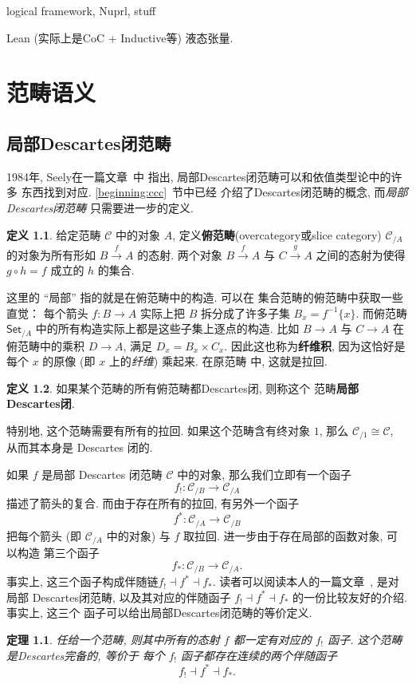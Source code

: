 \documentclass[UTF8]{ctexbook}
\theoremstyle{plain}
\newtheorem{theorem}{定理}[chapter]
\theoremstyle{definition}
\newtheorem{definition}{定义}[chapter]
\theoremstyle{remark}
\begin{document}
logical framework, Nuprl, stuff

Lean (实际上是CoC + Inductive等)
液态张量.\cite{scholze:2020:liquid}

\chapter{范畴语义}

\section{局部Descartes闭范畴}

1984年, Seely在一篇文章~\cite{seely:1984:lccc}中
指出, 局部Descartes闭范畴可以和依值类型论中的许多
东西找到对应. \ref{beginning:ccc}~节中已经
介绍了Descartes闭范畴的概念, 而\emph{局部Descartes闭范畴}
只需要进一步的定义.
\begin{definition}
给定范畴 \(\mathcal C\) 中的对象 \(A\),
定义\textbf{俯范畴}(overcategory或slice category)
\(\mathcal C_{/A}\) 的对象为所有形如
\(B \xrightarrow{f} A\) 的态射. 两个对象
\(B \xrightarrow f A\) 与 \(C \xrightarrow g A\)
之间的态射为使得 \(g \circ h = f\) 成立的 \(h\) 的集合.
\end{definition}
这里的 “局部” 指的就是在俯范畴中的构造. 可以在
集合范畴的俯范畴中获取一些直觉： 每个箭头
\(f : B \to A\) 实际上把 \(B\) 拆分成了许多子集
\(B_x = f^{-1}\{x\}\). 而俯范畴 \(\textsf{Set}_{/A}\)
中的所有构造实际上都是这些子集上逐点的构造. 比如
\(B \to A\) 与 \(C \to A\) 在俯范畴中的乘积
\(D \to A\), 满足 \(D_x = B_x \times C_x\).
因此这也称为\textbf{纤维积}, 因为这恰好是每个 \(x\)
的原像 (即 \(x\) 上的\emph{纤维}) 乘起来. 在原范畴
中, 这就是拉回.
\begin{definition}
如果某个范畴的所有俯范畴都Descartes闭, 则称这个
范畴\textbf{局部Descartes闭}.
\end{definition}
特别地, 这个范畴需要有所有的拉回. 如果这个范畴含有终对象
\(1\), 那么 \(\mathcal C_{/1} \cong \mathcal C\),
从而其本身是 Descartes 闭的.

如果 \(f\) 是局部 Descartes 闭范畴 \(\mathcal C\)
中的对象, 那么我们立即有一个函子
\[f_! : \mathcal C_{/B} \to \mathcal C_{/A}\]
描述了箭头的复合. 而由于存在所有的拉回, 有另外一个函子
\[f^* : \mathcal C_{/A} \to \mathcal C_{/B}\]
把每个箭头 (即 \(\mathcal C_{/A}\) 中的对象) 与
\(f\) 取拉回. 进一步由于存在局部的函数对象, 可以构造
第三个函子
\[f_* : \mathcal C_{/B} \to \mathcal C_{/A}.\]
事实上, 这三个函子构成伴随链\(f_!\dashv f^*\dashv f_*\).
读者可以阅读本人的一篇文章~\cite{me:2022:lccc}, 是对局部
Descartes闭范畴, 以及其对应的伴随函子 \(f_!\dashv
f^*\dashv f_*\) 的一份比较友好的介绍. 事实上, 这三个
函子可以给出局部Descartes闭范畴的等价定义.
\begin{theorem}
任给一个范畴, 则其中所有的态射 \(f\) 都一定有对应的
\(f_!\) 函子. 这个范畴是Descartes完备的, 等价于
每个 \(f_!\) 函子都存在连续的两个伴随函子
\[f_!\dashv f^*\dashv f_*.\]
\end{theorem}
\end{document}
